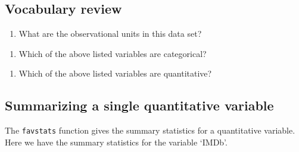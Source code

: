 \documentclass[
]{report}
\newenvironment{Shaded}{\begin{snugshade}}{\end{snugshade}}
\newcommand{\CommentTok}[1]{\textcolor[rgb]{0.56,0.35,0.01}{\textit{#1}}}
\newcommand{\KeywordTok}[1]{\textcolor[rgb]{0.13,0.29,0.53}{\textbf{#1}}}
\newcommand{\NormalTok}[1]{#1}
\newcommand{\OperatorTok}[1]{\textcolor[rgb]{0.81,0.36,0.00}{\textbf{#1}}}
\newcommand{\StringTok}[1]{\textcolor[rgb]{0.31,0.60,0.02}{#1}}
\providecommand{\tightlist}{%
  \setlength{\itemsep}{0pt}\setlength{\parskip}{0pt}}
\begin{document}
\newpage

\hypertarget{vocabulary-review}{%
\subsection{Vocabulary review}\label{vocabulary-review}}

\begin{enumerate}
\def\labelenumi{\arabic{enumi}.}
\tightlist
\item
  What are the observational units in this data set?
\end{enumerate}

\vspace{0.3in}

\begin{enumerate}
\def\labelenumi{\arabic{enumi}.}
\setcounter{enumi}{1}
\tightlist
\item
  Which of the above listed variables are categorical?
\end{enumerate}

\vspace{.5in}

\begin{enumerate}
\def\labelenumi{\arabic{enumi}.}
\setcounter{enumi}{2}
\tightlist
\item
  Which of the above listed variables are quantitative?
\end{enumerate}

\vspace{.5in}

\hypertarget{summarizing-a-single-quantitative-variable}{%
\subsection{Summarizing a single quantitative variable}\label{summarizing-a-single-quantitative-variable}}

The \texttt{favstats} function gives the summary statistics for a quantitative variable. Here we have the summary statistics for the variable `IMDb'.

\begin{Shaded}
\end{Shaded}
\end{document}

